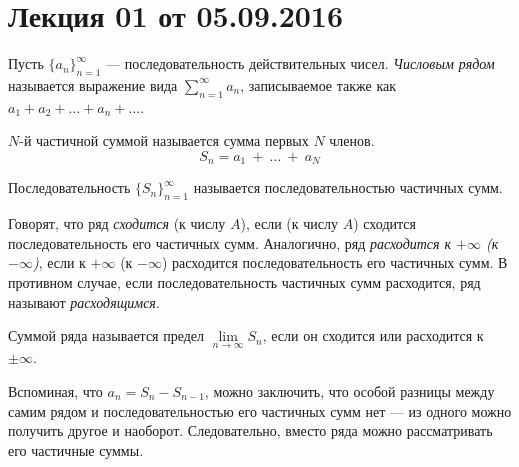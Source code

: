 \documentclass[a4paper, 12pt]{article}
\begin{document}
\pagestyle{fancy}
\section{Лекция 01 от 05.09.2016}
\begin{Def}
	Пусть \(\{a_n\}^{\infty}_{n=1}\) --- последовательность действительных чисел. \emph{Числовым рядом} называется выражение вида \(\sum\limits_{n=1}^{\infty}a_n\), записываемое также как \(a_1 + a_2 + \ldots + a_n + \ldots \).
	
\end{Def}
\begin{Def}
	\(N\)-й частичной суммой называется сумма первых \(N\) членов. 
	$$S_n = a_1~+~\ldots~+~a_N$$
\end{Def}

\begin{Def}
	Последовательность \(\{S_n\}^{\infty}_{n=1}\)
	называется последовательностью частичных сумм.
\end{Def}

Говорят, что ряд \textit{сходится} (к числу $A$), если (к числу $A$) сходится последовательность его частичных сумм. Аналогично, ряд \textit{расходится к $+\infty$ (к $-\infty$)}, если к $+\infty$ (к $-\infty$) расходится последовательность его частичных сумм. В противном случае, если последовательность частичных сумм расходится, ряд называют \textit{расходящимся}.

\begin{Def}
Суммой ряда называется предел $\lim\limits_{n \to \infty} S_n$, если он сходится или расходится к $\pm \infty$.
\end{Def}
Вспоминая, что $a_n = S_{n} - S_{n-1}$, можно заключить, что особой разницы между самим рядом и последовательностью его частичных сумм нет --- из одного можно получить другое и наоборот. Следовательно, вместо ряда можно рассматривать его частичные суммы.
\end{document}

